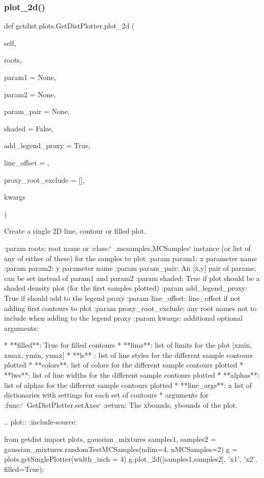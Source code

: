 \subsubsection{\texorpdfstring{plot\+\_\+2d()}{plot\_2d()}}
{\footnotesize\ttfamily def getdist.\+plots.\+Get\+Dist\+Plotter.\+plot\+\_\+2d (\begin{DoxyParamCaption}\item[{}]{self,  }\item[{}]{roots,  }\item[{}]{param1 = {\ttfamily None},  }\item[{}]{param2 = {\ttfamily None},  }\item[{}]{param\+\_\+pair = {\ttfamily None},  }\item[{}]{shaded = {\ttfamily False},  }\item[{}]{add\+\_\+legend\+\_\+proxy = {\ttfamily True},  }\item[{}]{line\+\_\+offset = {},  }\item[{}]{proxy\+\_\+root\+\_\+exclude = {\ttfamily \mbox{[}\mbox{]}},  }\item[{}]{kwargs }\end{DoxyParamCaption})}

\begin{DoxyVerb}Create a single 2D line, contour or filled plot.

:param roots: root name or :class:`~.mcsamples.MCSamples` instance (or list of any of either of these) for the samples to plot
:param param1: x parameter name
:param param2:  y parameter name
:param param_pair: An [x,y] pair of params; can be set instead of param1 and param2
:param shaded: True if plot should be a shaded density plot (for the first samples plotted)
:param add_legend_proxy: True if should add to the legend proxy
:param line_offset: line_offset if not adding first contours to plot
:param proxy_root_exclude: any root names not to include when adding to the legend proxy
:param kwargs: additional optional arguments:

* **filled**: True for filled contours
* **lims**: list of limits for the plot [xmin, xmax, ymin, ymax]
* **ls** : list of line styles for the different sample contours plotted 
* **colors**: list of colors for the different sample contours plotted 
* **lws**: list of line widths for the different sample contours plotted
* **alphas**: list of alphas for the different sample contours plotted 
* **line_args**: a list of dictionaries with settings for each set of contours
* arguments for :func:`~GetDistPlotter.setAxes`
:return: The xbounds, ybounds of the plot.

.. plot::
   :include-source:
   
    from getdist import plots, gaussian_mixtures
    samples1, samples2 = gaussian_mixtures.randomTestMCSamples(ndim=4, nMCSamples=2)
    g = plots.getSinglePlotter(width_inch = 4)
    g.plot_2d([samples1,samples2], 'x1', 'x2', filled=True);\end{DoxyVerb}
 

